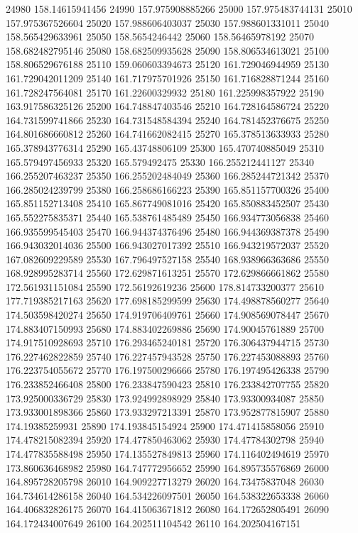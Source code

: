 {24980 158.14615941456
24990 157.975908885266
25000 157.975483744131
25010 157.975367526604
25020 157.988606403037
25030 157.988601331011
25040 158.565429633961
25050 158.5654246442
25060 158.56465978192
25070 158.682482795146
25080 158.682509935628
25090 158.806534613021
25100 158.806529676188
25110 159.060603394673
25120 161.729046944959
25130 161.729042011209
25140 161.717975701926
25150 161.716828871244
25160 161.728247564081
25170 161.22600329932
25180 161.225998357922
25190 163.917586325126
25200 164.748847403546
25210 164.728164586724
25220 164.731599741866
25230 164.731548584394
25240 164.781452376675
25250 164.801686660812
25260 164.741662082415
25270 165.378513633933
25280 165.378943776314
25290 165.43748806109
25300 165.470740885049
25310 165.579497456933
25320 165.579492475
25330 166.255212441127
25340 166.255207463237
25350 166.255202484049
25360 166.285244721342
25370 166.285024239799
25380 166.258686166223
25390 165.851157700326
25400 165.851152713408
25410 165.867749081016
25420 165.850883452507
25430 165.552275835371
25440 165.538761485489
25450 166.934773056838
25460 166.935599545403
25470 166.944374376496
25480 166.944369387378
25490 166.943032014036
25500 166.943027017392
25510 166.943219572037
25520 167.082609229589
25530 167.796497527158
25540 168.938966363686
25550 168.928995283714
25560 172.629871613251
25570 172.629866661862
25580 172.561931151084
25590 172.56192619236
25600 178.814733200377
25610 177.719385217163
25620 177.698185299599
25630 174.498878560277
25640 174.503598420274
25650 174.919706409761
25660 174.908569078447
25670 174.883407150993
25680 174.883402269886
25690 174.90045761889
25700 174.917510928693
25710 176.293465240181
25720 176.306437944715
25730 176.227462822859
25740 176.227457943528
25750 176.227453088893
25760 176.223754055672
25770 176.197500296666
25780 176.197495426338
25790 176.233852466408
25800 176.233847590423
25810 176.233842707755
25820 173.925000336729
25830 173.924992898929
25840 173.93300934087
25850 173.933001898366
25860 173.933297213391
25870 173.952877815907
25880 174.19385259931
25890 174.193845154924
25900 174.471415858056
25910 174.478215082394
25920 174.477850463062
25930 174.47784302798
25940 174.477835588498
25950 174.135527849813
25960 174.116402494619
25970 173.860636468982
25980 164.747772956652
25990 164.895735576869
26000 164.895728205798
26010 164.909227713279
26020 164.73475837048
26030 164.734614286158
26040 164.534226097501
26050 164.538322653338
26060 164.406832826175
26070 164.415063671812
26080 164.172652805491
26090 164.172434007649
26100 164.202511104542
26110 164.202504167151
}
